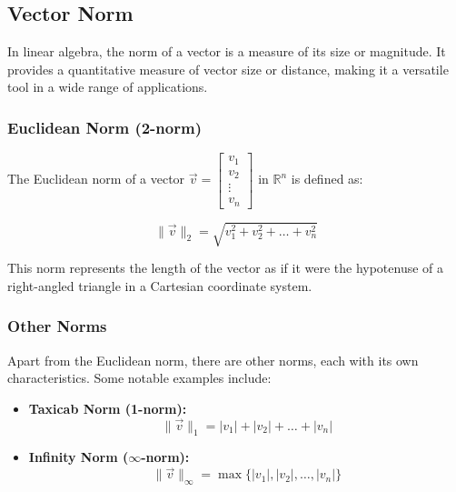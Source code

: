 \expandafter\def\expandafter\normalsize\expandafter{
  \setlength\abovedisplayskip{1ex}
  \setlength\belowdisplayskip{4ex}
  \setlength\abovedisplayshortskip{1ex}
  \setlength\belowdisplayshortskip{4ex}
}

\newtheorem{example}{Example}
\newtheorem{definition}{Definition}
\newtheorem{theorem}{Theorem}
\newtheorem{corollary}{Corollary}
\newtheorem{lemma}{Lemma}
\newtheorem{proposition}{Proposition}



\iffalse
\subsection{Vector Norm}

In linear algebra, the norm of a vector is a measure of its size or magnitude. It provides a quantitative measure of vector size or distance, making it a versatile tool in a wide range of applications.

\subsubsection{Euclidean Norm (2-norm)}

The Euclidean norm of a vector \(\vec{v} = \begin{bmatrix} v_1 \\ v_2 \\ \vdots \\ v_n \end{bmatrix}\) in \(\mathbb{R}^n\) is defined as:

\[
\|\vec{v}\|_2 = \sqrt{v_1^2 + v_2^2 + \ldots + v_n^2}
\]

This norm represents the length of the vector as if it were the hypotenuse of a right-angled triangle in a Cartesian coordinate system.

\subsubsection{Other Norms}

Apart from the Euclidean norm, there are other norms, each with its own characteristics. Some notable examples include:

\begin{itemize}
    \item \textbf{Taxicab Norm (1-norm):}
    \[
    \|\vec{v}\|_1 = |v_1| + |v_2| + \ldots + |v_n|
    \]
    
    \item \textbf{Infinity Norm (\(\infty\)-norm):}
    \[
    \|\vec{v}\|_{\infty} = \max\{|v_1|, |v_2|, \ldots, |v_n|\}
    \]
\end{itemize}


